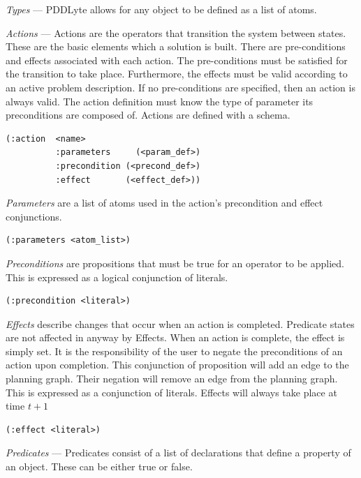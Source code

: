 \documentclass[
a4paper, %
11pt, %
onecolumn, %
openany, %
]{memoir}
\begin{document}
{\textit{Types} --- PDDLyte allows for any object to be defined as a list of atoms.

\textit{Actions} --- Actions are the operators that transition the system between states. These are the basic elements which a solution is built\cite{strips70}. There are pre-conditions and effects associated with each action. The pre-conditions must be satisfied for the transition to take place. Furthermore, the effects must be valid according to an active problem description. If no pre-conditions are specified, then an action is always valid. The action definition must know the type of parameter its preconditions are composed of. Actions are defined with a schema. 

\begin{lstlisting}
(:action  <name>
          :parameters     (<param_def>)
          :precondition (<precond_def>)
          :effect       (<effect_def>))
\end{lstlisting}

\textit{Parameters} are a list of atoms used in the action's precondition and effect conjunctions.

\begin{lstlisting}
(:parameters <atom_list>)
\end{lstlisting}

\textit{Preconditions} are propositions that must be true for an operator to be applied. This is expressed as a logical conjunction of literals.

\begin{lstlisting}
(:precondition <literal>)
\end{lstlisting}

\textit{Effects} describe changes that occur when an action is completed. Predicate states are not affected in anyway by Effects. When an action is complete, the effect is simply set. It is the responsibility of the user to negate the preconditions of an action upon completion. This conjunction of proposition will add an edge to the planning graph. Their negation will remove an edge from the planning graph. This is expressed as a conjunction of literals. Effects will always take place at time $t+1$

\begin{lstlisting}
(:effect <literal>)
\end{lstlisting}

\textit{Predicates} --- Predicates consist of a list of declarations that define a property of an object. These can be either true or false. 

}
\end{document}

